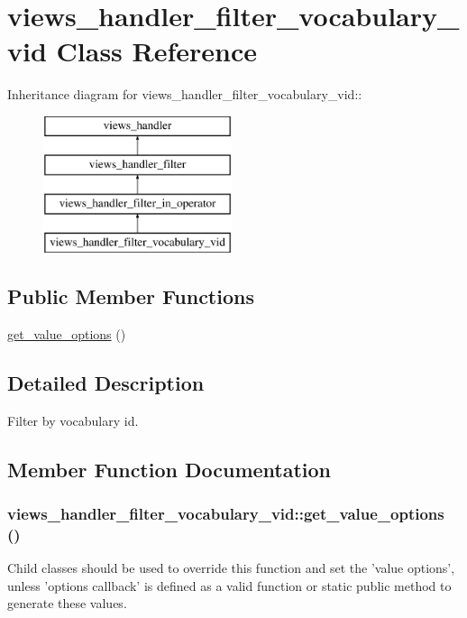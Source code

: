 \hypertarget{classviews__handler__filter__vocabulary__vid}{
\section{views\_\-handler\_\-filter\_\-vocabulary\_\-vid Class Reference}
\label{classviews__handler__filter__vocabulary__vid}
}
Inheritance diagram for views\_\-handler\_\-filter\_\-vocabulary\_\-vid::\begin{figure}[H]
\begin{center}
\leavevmode
\includegraphics[height=4cm]{classviews__handler__filter__vocabulary__vid}
\end{center}
\end{figure}
\subsection*{Public Member Functions}
\begin{DoxyCompactItemize}
\item 
\hyperlink{classviews__handler__filter__vocabulary__vid_af4ac6b0c4da1408c4a96e096412eae3a}{get\_\-value\_\-options} ()
\end{DoxyCompactItemize}


\subsection{Detailed Description}
Filter by vocabulary id. 

\subsection{Member Function Documentation}
\hypertarget{classviews__handler__filter__vocabulary__vid_af4ac6b0c4da1408c4a96e096412eae3a}{
\subsubsection[{get\_\-value\_\-options}]{\setlength{\rightskip}{0pt plus 5cm}views\_\-handler\_\-filter\_\-vocabulary\_\-vid::get\_\-value\_\-options ()}}
\label{classviews__handler__filter__vocabulary__vid_af4ac6b0c4da1408c4a96e096412eae3a}
Child classes should be used to override this function and set the 'value options', unless 'options callback' is defined as a valid function or static public method to generate these values.

